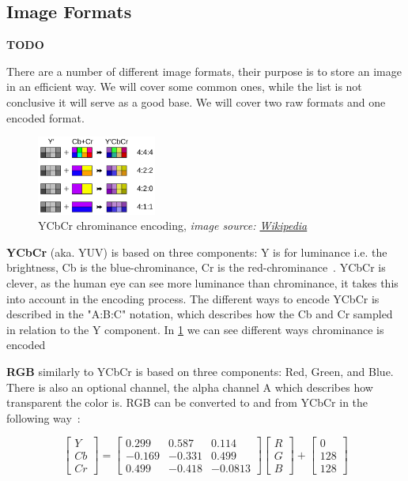 \subsection{Image Formats} \label{section:imageformats}
\textbf{TODO}

There are a number of different image formats, their purpose is to store an
image in an efficient way. We will cover some common ones, while the list is
not conclusive it will serve as a good base. We will cover two raw formats and
one encoded format.

\begin{figure}
  \centering
  \includegraphics[width=0.35\textwidth]{figures/ycbcr.png}
  \caption{YCbCr chrominance encoding, \textit{image source: \href{https://en.wikipedia.org/wiki/Chroma_subsampling}{Wikipedia}}}
  \label{fig:ycbcr}
\end{figure}
\textbf{YCbCr} (aka. YUV) is based on three components: Y is for luminance i.e. the
brightness, Cb is the blue-chrominance, Cr is the
red-chrominance~\cite{safir2022rgb}. YCbCr is clever, as the human eye can see
more luminance than chrominance, it takes this into account in the
encoding process. The different ways to encode YCbCr is described in the
"A:B:C" notation, which describes how the Cb and Cr sampled in relation to the
Y component. In \cref{fig:ycbcr} we can see different ways chrominance is
encoded

\textbf{RGB} similarly to YCbCr is based on three components: Red, Green, and
Blue. There is also an optional channel, the alpha channel A which describes
how transparent the color is. RGB can be converted to and from YCbCr in the
following way~\cite{yang2007ycbcr}:

\[
\begin{bmatrix}
Y \\
Cb \\
Cr
\end{bmatrix}
=
\begin{bmatrix}
0.299 & 0.587 & 0.114 \\
-0.169 & -0.331 & 0.499 \\
0.499 & -0.418 & -0.0813
\end{bmatrix}
\begin{bmatrix}
R \\
G \\
B
\end{bmatrix}
+
\begin{bmatrix}
0 \\
128 \\
128
\end{bmatrix}
\]

